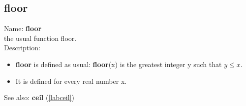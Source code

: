 \subsection{floor}
\label{labfloor}
\noindent Name: \textbf{floor}\\
the usual function floor.\\

\noindent Description: \begin{itemize}

\item \textbf{floor} is defined as usual: \textbf{floor}(x) is the greatest integer y such that $y \le x$.

\item It is defined for every real number x.
\end{itemize}
See also: \textbf{ceil} (\ref{labceil})
